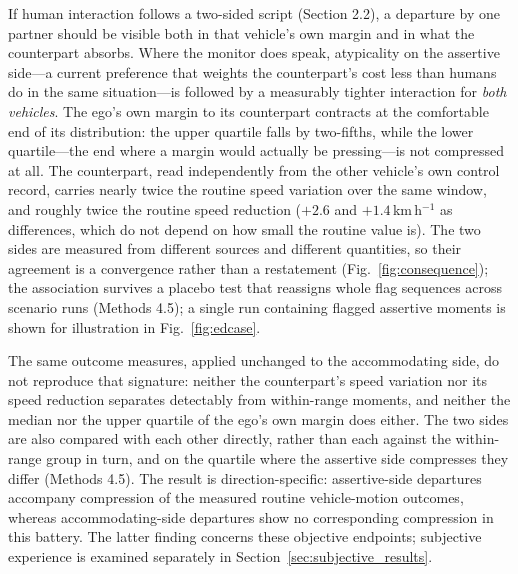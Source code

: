 \documentclass[12pt,a4paper]{article}
\begin{document}
If human interaction follows a two-sided script (Section 2.2), a departure by one partner should be
visible both in that vehicle's own margin and in what the counterpart absorbs. Where the monitor does
speak, atypicality on the assertive side---a current preference that weights the counterpart's cost less
than humans do in the same situation---is followed by a measurably tighter interaction for
\emph{both vehicles}. The ego's own margin to its counterpart contracts at the
comfortable end of its distribution: the upper quartile falls by two-fifths, while the lower
quartile---the end where a margin would actually be pressing---is not compressed at all. The
counterpart, read independently from the other vehicle's own control record, carries nearly
twice the routine speed variation over the same window, and roughly twice the routine speed reduction
($+2.6$ and $+1.4$\,km\,h$^{-1}$ as differences, which do not depend on how small the routine value
is). The two
sides are measured from different sources and different quantities, so their agreement is a
convergence rather than a restatement (Fig.~\ref{fig:consequence}); the association survives a
placebo test that reassigns whole flag sequences across scenario runs (Methods 4.5); a single run containing flagged
assertive moments is shown for illustration in Fig.~\ref{fig:edcase}.

The same outcome measures, applied unchanged to the accommodating side, do not reproduce that
signature: neither the counterpart's speed variation nor its speed reduction separates detectably
from within-range moments, and neither the median nor the upper quartile of the ego's own margin
does either. The two sides are also compared
with each other directly, rather than each against the within-range group in turn, and on the
quartile where the assertive side compresses they differ (Methods 4.5).
The result is direction-specific: assertive-side departures accompany compression of the measured
routine vehicle-motion outcomes, whereas accommodating-side departures show no corresponding
compression in this battery. The latter finding concerns these objective endpoints; subjective
experience is examined separately in Section~\ref{sec:subjective_results}.
\end{document}
